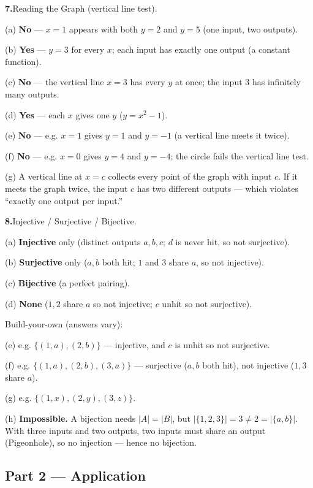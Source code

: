 \documentclass[12pt]{article}
\begin{document}
\bigskip
\textbf{7.}\quad Reading the Graph (vertical line test).

(a)\; \textbf{No} --- $x=1$ appears with both $y=2$ and $y=5$ (one input, two outputs).

(b)\; \textbf{Yes} --- $y=3$ for every $x$; each input has exactly one output (a constant function).

(c)\; \textbf{No} --- the vertical line $x=3$ has every $y$ at once; the input $3$ has infinitely many outputs.

(d)\; \textbf{Yes} --- each $x$ gives one $y$ ($y = x^2-1$).

(e)\; \textbf{No} --- e.g. $x=1$ gives $y=1$ and $y=-1$ (a vertical line meets it twice).

(f)\; \textbf{No} --- e.g. $x=0$ gives $y=4$ and $y=-4$; the circle fails the vertical line test.

(g)\; A vertical line at $x=c$ collects every point of the graph with input $c$. If it meets the graph twice,
the input $c$ has two different outputs --- which violates ``exactly one output per input.''

\bigskip
\textbf{8.}\quad Injective / Surjective / Bijective.

(a)\; \textbf{Injective} only (distinct outputs $a,b,c$; $d$ is never hit, so not surjective).

(b)\; \textbf{Surjective} only ($a,b$ both hit; $1$ and $3$ share $a$, so not injective).

(c)\; \textbf{Bijective} (a perfect pairing).

(d)\; \textbf{None} ($1,2$ share $a$ so not injective; $c$ unhit so not surjective).

Build-your-own (answers vary):

(e)\; e.g. $\{(1,a),(2,b)\}$ --- injective, and $c$ is unhit so not surjective.

(f)\; e.g. $\{(1,a),(2,b),(3,a)\}$ --- surjective ($a,b$ both hit), not injective ($1,3$ share $a$).

(g)\; e.g. $\{(1,x),(2,y),(3,z)\}$.

(h)\; \textbf{Impossible.} A bijection needs $|A|=|B|$, but $|\{1,2,3\}| = 3 \ne 2 = |\{a,b\}|$. With three
inputs and two outputs, two inputs must share an output (Pigeonhole), so no injection --- hence no bijection.

\subsection*{Part 2 --- Application}
\end{document}
